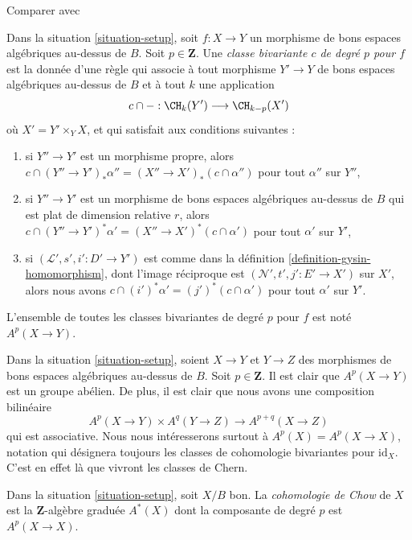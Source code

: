 \begin{definition}
\label{definition-bivariant-class}
\begin{reference}
Comparer avec \cite[Definition 17.1]{F}
\end{reference}
Dans la situation \ref{situation-setup}, soit $f : X \to Y$ un morphisme de
bons espaces algébriques au-dessus de $B$. Soit $p \in \mathbf{Z}$. Une
{\it classe bivariante $c$ de degré $p$ pour $f$} est la donnée d'une règle qui
associe à tout morphisme $Y' \to Y$ de bons espaces algébriques au-dessus de $B$ et à
tout $k$ une application
$$
c \cap - : \CH_k(Y') \longrightarrow \CH_{k - p}(X')
$$
où $X' = Y' \times_Y X$, et qui satisfait aux conditions suivantes :
\begin{enumerate}
\item si $Y'' \to Y'$ est un morphisme propre, alors $c \cap (Y'' \to
Y')_*\alpha'' = (X'' \to X')_*(c \cap \alpha'')$ pour tout $\alpha''$ sur
$Y''$,
\item si $Y'' \to Y'$ est un morphisme de bons espaces algébriques au-dessus de $B$ qui est
plat de dimension relative $r$, alors $c \cap (Y'' \to Y')^*\alpha' = (X'' \to
X')^*(c \cap \alpha')$ pour tout $\alpha'$ sur $Y'$,
\item si $(\mathcal{L}', s', i' : D' \to Y')$ est comme dans la définition
\ref{definition-gysin-homomorphism}, dont l'image réciproque est $(\mathcal{N}', t', j' : E'
\to X')$ sur $X'$, alors nous avons $c \cap (i')^*\alpha' = (j')^*(c \cap
\alpha')$ pour tout $\alpha'$ sur $Y'$.
\end{enumerate}
L'ensemble de toutes les classes bivariantes de degré $p$ pour $f$ est noté
$A^p(X \to Y)$.
\end{definition}

\noindent
Dans la situation \ref{situation-setup}, soient $X \to Y$ et $Y \to Z$ des
morphismes de bons espaces algébriques au-dessus de $B$. Soit $p \in \mathbf{Z}$. Il
est clair que $A^p(X \to Y)$ est un groupe abélien. De plus, il est clair que
nous avons une composition bilinéaire
$$
A^p(X \to Y) \times A^q(Y \to Z) \to A^{p + q}(X \to Z)
$$
qui est associative. Nous nous intéresserons surtout à $A^p(X) = A^p(X \to X)$,
notation qui désignera toujours les classes de cohomologie bivariantes pour
$\text{id}_X$. C'est en effet là que vivront les classes de Chern.

\begin{definition}
\label{definition-chow-cohomology}
Dans la situation \ref{situation-setup}, soit $X/B$ bon. La
{\it cohomologie de Chow} de $X$ est la $\mathbf{Z}$-algèbre graduée $A^*(X)$ dont
la composante de degré $p$ est $A^p(X \to X)$.
\end{definition}

